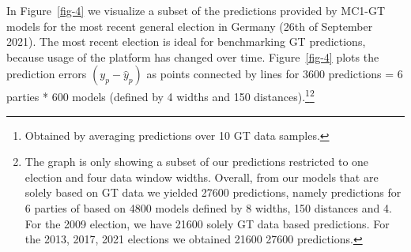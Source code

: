 \documentclass[
  letterpaper,
  DIV=11,
  numbers=noendperiod]{scrartcl}
\begin{document}
In Figure~\ref{fig-4} we visualize a subset of the predictions provided
by MC1-GT models for the most recent general election in Germany (26th
of September 2021). The most recent election is ideal for benchmarking
GT predictions, because usage of the platform has changed over time.
Figure~\ref{fig-4} plots the prediction errors \((y_{p}-\hat{y}_{p})\)
as points connected by lines for 3600 predictions = 6 parties * 600
models (defined by 4 widths and 150 distances).\footnote{Obtained by
  averaging predictions over 10 GT data samples.}\footnote{The graph is
  only showing a subset of our predictions restricted to one election
  and four data window widths. Overall, from our models that are solely
  based on GT data we yielded 27600 predictions, namely predictions for
  6 parties of based on 4800 models defined by 8 widths, 150 distances
  and 4. For the 2009 election, we have 21600 solely GT data based
  predictions. For the 2013, 2017, 2021 elections we obtained 21600
  27600 predictions.}
\end{document}
